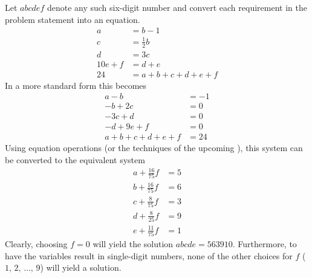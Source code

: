 Let $abcdef$ denote any such six-digit number and convert each requirement in the problem statement into an equation.
%
\begin{align*}
a&=b-1\\
c&=\frac{1}{2}b\\
d&=3c\\
10e+f&=d+e\\
24&=a+b+c+d+e+f
\end{align*}
%
In a more standard form this becomes
%
\begin{align*}
a-b&=-1\\
-b+2c&=0\\
-3c+d&=0\\
-d+9e+f&=0\\
a+b+c+d+e+f&=24
\end{align*}
%
Using equation operations (or the techniques of the upcoming ), this system can be converted to the equivalent system
%
\begin{align*}
a+\frac{16}{75}f &= 5\\
b+\frac{16}{75}f &= 6\\
c+ \frac{8}{75}f &= 3\\
d+ \frac{8}{25}f &= 9\\
e+\frac{11}{75}f &= 1
\end{align*}
%
Clearly, choosing $f=0$ will yield the solution $abcde=563910$.  Furthermore, to have the variables result in single-digit numbers, none of the other choices for $f$ ($1,\,2,\,\ldots,\,9$) will yield a solution.